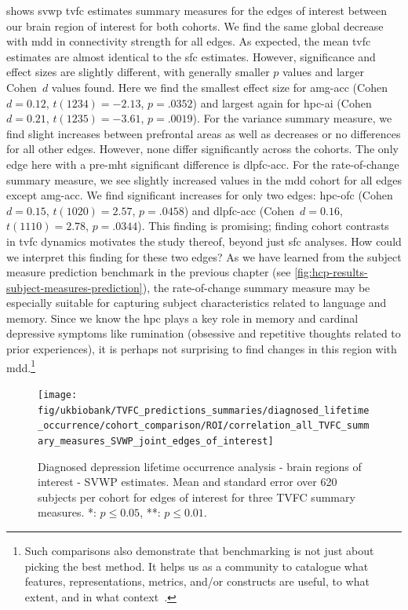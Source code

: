  shows \gls{svwp} \gls{tvfc} estimates summary measures for the edges of interest between our brain region of interest for both cohorts.
%
We find the same global decrease with \gls{mdd} in connectivity strength for all edges.
As expected, the mean \gls{tvfc} estimates are almost identical to the \gls{sfc} estimates.
However, significance and effect sizes are slightly different, with generally smaller $p$ values and larger Cohen~$d$ values found.
Here we find the smallest effect size for \gls{amg}-\gls{acc} (Cohen~$d = 0.12$, $t(1234) = -2.13$, $p = .0352$) and largest again for \gls{hpc}-\gls{ai} (Cohen~$d = 0.21$, $t(1235) = -3.61$, $p = .0019$).
%
For the variance summary measure, we find slight increases between prefrontal areas as well as decreases or no differences for all other edges.
However, none differ significantly across the cohorts.
The only edge here with a pre-\gls{mht} significant difference is \gls{dlpfc}-\gls{acc}.
%
For the rate-of-change summary measure, we see slightly increased values in the \gls{mdd} cohort for all edges except \gls{amg}-\gls{acc}.
We find significant increases for only two edges: \gls{hpc}-\gls{ofc} (Cohen~$d = 0.15$, $t(1020) = 2.57$, $p = .0458$) and \gls{dlpfc}-\gls{acc} (Cohen~$d = 0.16$, $t(1110) = 2.78$, $p = .0344$).
This finding is promising; finding cohort contrasts in \gls{tvfc} dynamics motivates the study thereof, beyond just \gls{sfc} analyses.
How could we interpret this finding for these two edges?
As we have learned from the subject measure prediction benchmark in the previous chapter (see \cref{fig:hcp-results-subject-measures-prediction}), the rate-of-change summary measure may be especially suitable for capturing subject characteristics related to language and memory.
Since we know the \gls{hpc} plays a key role in memory and cardinal depressive symptoms like rumination (obsessive and repetitive thoughts related to prior experiences), it is perhaps not surprising to find changes in this region with \gls{mdd}.\footnote{Such comparisons also demonstrate that benchmarking is not just about picking the best method. It helps us as a community to catalogue what features, representations, metrics, and/or constructs are useful, to what extent, and in what context~\parencite[see also][]{Voytek2022}.}


\begin{figure}[t]
  \centering
  \texttt{[image: fig/ukbiobank/TVFC\_predictions\_summaries/diagnosed\_lifetime\_occurrence/cohort\_comparison/ROI/correlation\_all\_TVFC\_summary\_measures\_SVWP\_joint\_edges\_of\_interest]}
  \caption{
    Diagnosed depression lifetime occurrence analysis - brain regions of interest - SVWP estimates.
    Mean and standard error over 620 subjects per cohort for edges of interest for three TVFC summary measures.
    *: $p \leq 0.05$, **: $p \leq 0.01$.
  }
  \label{fig:ukb-results-dlo-roi-cohort-comparison-edges-of-interest-wp}
\end{figure}


